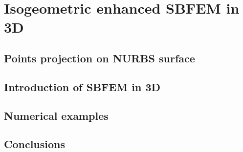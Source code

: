 
\chapter{Isogeometric enhanced SBFEM in 3D}


\section{Points projection on NURBS surface}
\textcolor{red}{


}


\section{Introduction of SBFEM in 3D}

\section{Numerical examples}



\section{Conclusions}